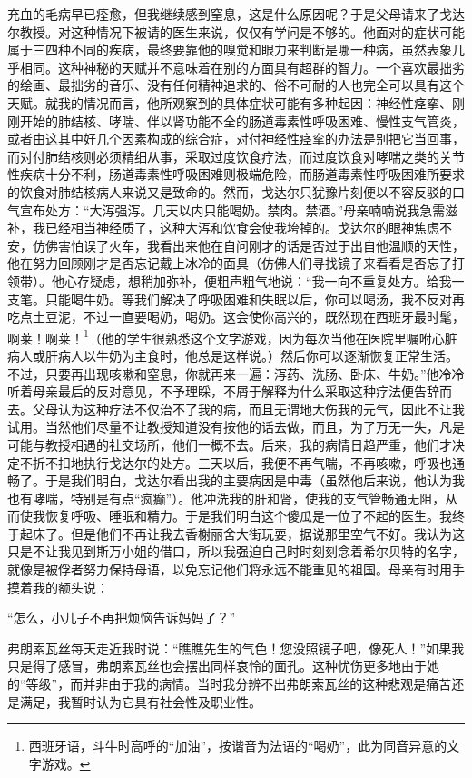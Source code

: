 \par 充血的毛病早已痊愈，但我继续感到窒息，这是什么原因呢？于是父母请来了戈达尔教授。对这种情况下被请的医生来说，仅仅有学问是不够的。他面对的症状可能属于三四种不同的疾病，最终要靠他的嗅觉和眼力来判断是哪一种病，虽然表象几乎相同。这种神秘的天赋并不意味着在别的方面具有超群的智力。一个喜欢最拙劣的绘画、最拙劣的音乐、没有任何精神追求的、俗不可耐的人也完全可以具有这个天赋。就我的情况而言，他所观察到的具体症状可能有多种起因：神经性痉挛、刚刚开始的肺结核、哮喘、伴以肾功能不全的肠道毒素性呼吸困难、慢性支气管炎，或者由这其中好几个因素构成的综合症，对付神经性痉挛的办法是别把它当回事，而对付肺结核则必须精细从事，采取过度饮食疗法，而过度饮食对哮喘之类的关节性疾病十分不利，肠道毒素性呼吸困难则极端危险，而肠道毒素性呼吸困难所要求的饮食对肺结核病人来说又是致命的。然而，戈达尔只犹豫片刻便以不容反驳的口气宣布处方：“大泻强泻。几天以内只能喝奶。禁肉。禁酒。”母亲喃喃说我急需滋补，我已经相当神经质了，这种大泻和饮食会使我垮掉的。戈达尔的眼神焦虑不安，仿佛害怕误了火车，我看出来他在自问刚才的话是否过于出自他温顺的天性，他在努力回顾刚才是否忘记戴上冰冷的面具（仿佛人们寻找镜子来看看是否忘了打领带）。他心存疑虑，想稍加弥补，便粗声粗气地说：“我一向不重复处方。给我一支笔。只能喝牛奶。等我们解决了呼吸困难和失眠以后，你可以喝汤，我不反对再吃点土豆泥，不过一直要喝奶，喝奶。这会使你高兴的，既然现在西班牙最时髦，啊莱！啊莱！\footnote{西班牙语，斗牛时高呼的“加油”，按谐音为法语的“喝奶”，此为同音异意的文字游戏。}（他的学生很熟悉这个文字游戏，因为每次当他在医院里嘱咐心脏病人或肝病人以牛奶为主食时，他总是这样说。）然后你可以逐渐恢复正常生活。不过，只要再出现咳嗽和窒息，你就再来一遍：泻药、洗肠、卧床、牛奶。”他冷冷听着母亲最后的反对意见，不予理睬，不屑于解释为什么采取这种疗法便告辞而去。父母认为这种疗法不仅治不了我的病，而且无谓地大伤我的元气，因此不让我试用。当然他们尽量不让教授知道没有按他的话去做，而且，为了万无一失，凡是可能与教授相遇的社交场所，他们一概不去。后来，我的病情日趋严重，他们才决定不折不扣地执行戈达尔的处方。三天以后，我便不再气喘，不再咳嗽，呼吸也通畅了。于是我们明白，戈达尔看出我的主要病因是中毒（虽然他后来说，他认为我也有哮喘，特别是有点“疯癫”）。他冲洗我的肝和肾，使我的支气管畅通无阻，从而使我恢复呼吸、睡眠和精力。于是我们明白这个傻瓜是一位了不起的医生。我终于起床了。但是他们不再让我去香榭丽舍大街玩耍，据说那里空气不好。我认为这只是不让我见到斯万小姐的借口，所以我强迫自己时时刻刻念着希尔贝特的名字，就像是被俘者努力保持母语，以免忘记他们将永远不能重见的祖国。母亲有时用手摸着我的额头说：
\par “怎么，小儿子不再把烦恼告诉妈妈了？”
\par 弗朗索瓦丝每天走近我时说：“瞧瞧先生的气色！您没照镜子吧，像死人！”如果我只是得了感冒，弗朗索瓦丝也会摆出同样哀怜的面孔。这种忧伤更多地由于她的“等级”，而并非由于我的病情。当时我分辨不出弗朗索瓦丝的这种悲观是痛苦还是满足，我暂时认为它具有社会性及职业性。
